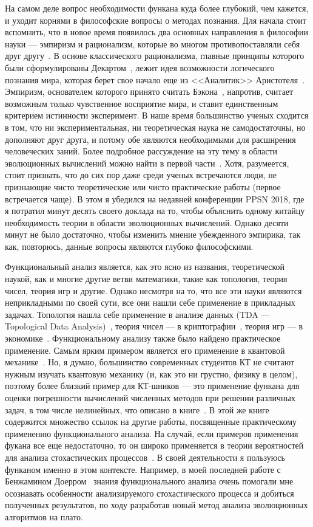 \documentclass[russian]{article}
\begin{document}
На самом деле вопрос необходимости функана куда более глубокий, чем кажется, и уходит корнями в философские вопросы о методах познания. Для начала стоит вспомнить, что в новое время появилось два основных направления в философии науки --- эмпиризм и рационализм, которые во многом противопоставляли себя друг другу~\cite{phil}. В основе классического рационализма, главные принципы которого были сформулированы Декартом~\cite{descartes}, лежит идея возможности логического познания мира, которая берет свое начало еще из <<Аналитик>> Аристотеля~\cite{aristotel}. Эмпиризм, основателем которого принято считать Бэкона~\cite{bacon}, напротив, считает возможным только чувственное восприятие мира, и ставит единственным критерием истинности эксперимент. В наше время большинство ученых сходится в том, что ни экспериментальная, ни теоретическая наука не самодостаточны, но дополняют друг друга, и потому обе являются необходимыми для расширения человеческих заний. Более подробное рассуждение на эту тему в области эволюционных вычислений можно найти в первой части~\cite{doerr}. Хотя, разумеется, стоит признать, что до сих пор даже среди ученых встречаются люди, не признающие чисто теоретические или чисто практические работы (первое встречается чаще). В этом я убедился на недавней конференции PPSN 2018, где я потратил минут десять своего доклада на то, чтобы объяснить одному китайцу необходимость теории в области эволюционных вычислений. Однако десяти минут не было достаточно, чтобы изменить мнение убежденного эмпирика, так как, повторюсь, данные вопросы являются глубоко философскими.

Функциональный анализ является, как это ясно из названия, теоретической наукой, как и многие другие ветви математики, такие как топология, теория чисел, теория игр и другие. Однако несмотря на то, что все эти науки являются неприкладными по своей сути, все они нашли себе применение в прикладных задачах. Топология нашла себе применение в анализе данных (TDA --- Topological Data Analysis)~\cite{topology}, теория чисел --- в криптографии~\cite{numbers}, теория игр --- в экономике~\cite{games}. Функциональному анализу также было найдено практическое применение. Самым ярким примером является его применение в квантовой механике~\cite{quantum}. Но, я думаю, большинство современных студентов КТ не считают нужным изучать квантовую механику (и, как это ни грустно, физику в целом), поэтому более близкий пример для КТ-шников --- это применение функана для оценки погрешности вычислений численных методов при решении различных задач, в том числе нелинейных, что описано в книге~\cite{kollats}. В этой же книге содержится множество ссылок на другие работы, посвященные практическому применению функционального анализа. На случай, если примеров применения фукана все еще недостаточно, то он широко применяется в теории вероятностей для анализа стохастических процессов~\cite{prob}. В своей деятельности я пользуюсь функаном именно в этом контексте. Например, в моей последней работе с Бенжамином Доерром~\cite{plateau} знания функционального анализа очень помогали мне осознавать особенности анализируемого стохастического процесса и добиться полученных результатов, по ходу разработав новый метод анализа эволюционных алгоритмов на плато.
\end{document}
